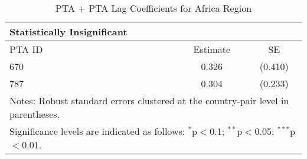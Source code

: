\begin{table}[htbp]
    \centering
    \caption{PTA + PTA Lag Coefficients for Africa Region}
    \label{tab:pta_africa}
    \begin{adjustbox}{max width=\textwidth}
    \begin{tabular}{lcc}
    \hline
    \textbf{Statistically Insignificant} &  &  \\
    \hline
    PTA ID & Estimate & SE \\
    \hline
    670 & 0.326 & (0.410) \\
    787 & 0.304 & (0.233) \\
    \hline
    \multicolumn{3}{l}{\footnotesize{Notes: Robust standard errors clustered at the country-pair level in parentheses.}} \\
    \multicolumn{3}{l}{\footnotesize{Significance levels are indicated as follows: $^{\ast}$p$<$0.1; $^{\ast\ast}$p$<$0.05; $^{\ast\ast\ast}$p$<$0.01.}} \\
    \end{tabular}
    \end{adjustbox}
\end{table}
